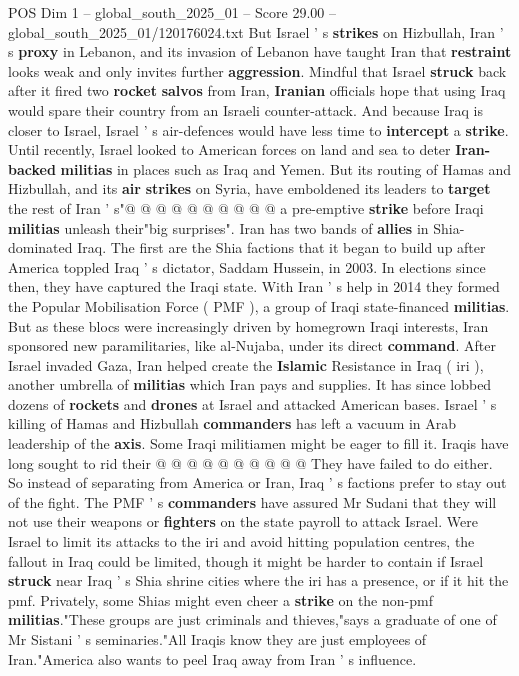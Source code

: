 \begin{textsample}{POS Dim 1 – global\_south\_2025\_01 – Score 29.00 – global\_south\_2025\_01/120176024.txt}
But Israel ' s \textbf{strikes} on Hizbullah, Iran ' s \textbf{proxy} in Lebanon, and its invasion of Lebanon have taught Iran that \textbf{restraint} looks weak and only invites further \textbf{aggression}.
Mindful that Israel \textbf{struck} back after it fired two \textbf{rocket} \textbf{salvos} from Iran, \textbf{Iranian} officials hope that using Iraq would spare their country from an Israeli counter-attack.
And because Iraq is closer to Israel, Israel ' s air-defences would have less time to \textbf{intercept} a \textbf{strike}.
Until recently, Israel looked to American forces on land and sea to deter \textbf{Iran-backed} \textbf{militias} in places such as Iraq and Yemen.
But its routing of Hamas and Hizbullah, and its \textbf{air} \textbf{strikes} on Syria, have emboldened its leaders to \textbf{target} the rest of Iran ' s"@ @ @ @ @ @ @ @ @ @ a pre-emptive \textbf{strike} before Iraqi \textbf{militias} unleash their"big surprises".
Iran has two bands of \textbf{allies} in Shia-dominated Iraq.
The first are the Shia factions that it began to build up after America toppled Iraq ' s dictator, Saddam Hussein, in 2003.
In elections since then, they have captured the Iraqi state.
With Iran ' s help in 2014 they formed the Popular Mobilisation Force ( PMF ), a group of Iraqi state-financed \textbf{militias}.
But as these blocs were increasingly driven by homegrown Iraqi interests, Iran sponsored new paramilitaries, like al-Nujaba, under its direct \textbf{command}.
After Israel invaded Gaza, Iran helped create the \textbf{Islamic} Resistance in Iraq ( iri ), another umbrella of \textbf{militias} which Iran pays and supplies.
It has since lobbed dozens of \textbf{rockets} and \textbf{drones} at Israel and attacked American bases.
Israel ' s killing of Hamas and Hizbullah \textbf{commanders} has left a vacuum in Arab leadership of the \textbf{axis}.
Some Iraqi militiamen might be eager to fill it.
Iraqis have long sought to rid their @ @ @ @ @ @ @ @ @ @ They have failed to do either.
So instead of separating from America or Iran, Iraq ' s factions prefer to stay out of the fight.
The PMF ' s \textbf{commanders} have assured Mr Sudani that they will not use their weapons or \textbf{fighters} on the state payroll to attack Israel.
Were Israel to limit its attacks to the iri and avoid hitting population centres, the fallout in Iraq could be limited, though it might be harder to contain if Israel \textbf{struck} near Iraq ' s Shia shrine cities where the iri has a presence, or if it hit the pmf.
Privately, some Shias might even cheer a \textbf{strike} on the non-pmf \textbf{militias}."These groups are just criminals and thieves,"says a graduate of one of Mr Sistani ' s seminaries."All Iraqis know they are just employees of Iran."America also wants to peel Iraq away from Iran ' s influence.

\end{textsample}
